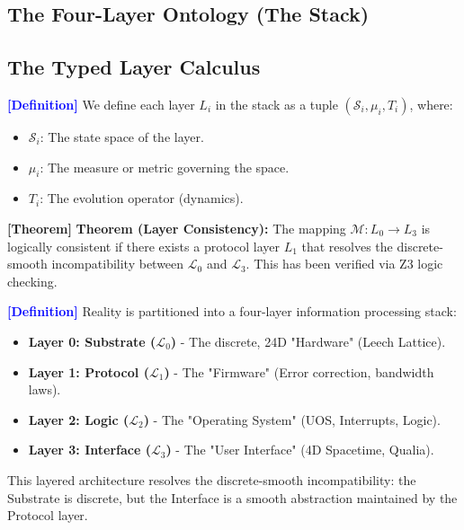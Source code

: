 \documentclass[11pt,titlepage]{article}
\newcommand{\substrate}{\mathcal{L}_0}
\newcommand{\protocol}{\mathcal{L}_1}
\newcommand{\logic}{\mathcal{L}_2}
\newcommand{\interface}{\mathcal{L}_3}
\newcommand{\tagdef}{\textcolor{blue}{\textbf{[Definition]}} }
\newcommand{\tagtheo}{\textcolor{green!60!black}{\textbf{[Theorem]}} }
\begin{document}
\subsection{The Four-Layer Ontology (The Stack)}

\subsection{The Typed Layer Calculus}
\tagdef We define each layer $L_i$ in the stack as a tuple $(\mathcal{S}_i, \mu_i, T_i)$, where:
\begin{itemize}
    
\item $\mathcal{S}_i$: The state space of the layer.
    
\item $\mu_i$: The measure or metric governing the space.
    
\item $T_i$: The evolution operator (dynamics).
\end{itemize}

\tagtheo \textbf{Theorem (Layer Consistency):} The mapping $\mathcal{M}: L_0 \to L_3$ is logically consistent if there exists a protocol layer $L_1$ that resolves the discrete-smooth incompatibility between $\substrate$ and $\interface$. This has been verified via Z3 logic checking.

\tagdef Reality is partitioned into a four-layer information processing stack:
\begin{itemize}
    
\item \textbf{Layer 0: Substrate ($\substrate$)} - The discrete, 24D "Hardware" (Leech Lattice).
    
\item \textbf{Layer 1: Protocol ($\protocol$)} - The "Firmware" (Error correction, bandwidth laws).
    
\item \textbf{Layer 2: Logic ($\logic$)} - The "Operating System" (UOS, Interrupts, Logic).
    
\item \textbf{Layer 3: Interface ($\interface$)} - The "User Interface" (4D Spacetime, Qualia).
\end{itemize}
This layered architecture resolves the discrete-smooth incompatibility: the Substrate is discrete, but the Interface is a smooth abstraction maintained by the Protocol layer.
\end{document}
